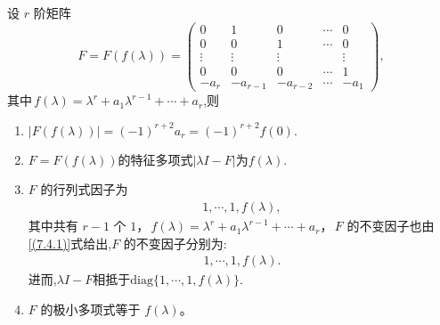 \documentclass[../../main.tex]{subfiles}
\begin{document}
\begin{lemma}[Frobenius块的基本性质]\label{lemma:Frobenius标准型矩阵的极小多项式和不变因子}
设 $r$ 阶矩阵
\[
F=F(f(\lambda)) = \begin{pmatrix}
0 & 1 & 0 & \cdots & 0 \\
0 & 0 & 1 & \cdots & 0 \\
\vdots & \vdots & \vdots & & \vdots \\
0 & 0 & 0 & \cdots & 1 \\
-a_r & -a_{r - 1} & -a_{r - 2} & \cdots & -a_1
\end{pmatrix},
\]
其中$\,f(\lambda)=\lambda^r + a_1\lambda^{r - 1}+\cdots + a_r$,则
\begin{enumerate}[(1)]
\item $|F(f(\lambda))|=(-1)^{r+2}a_r=(-1)^{r+2}f(0).$

\item $F=F(f(\lambda))$的特征多项式$|\lambda I-F|$为$f(\lambda)$.

\item $F$ 的行列式因子为
\begin{align}
1,\cdots,1,f(\lambda),\label{(7.4.1)}
\end{align}
其中共有 $r - 1$ 个 $1$，$\,f(\lambda)=\lambda^r + a_1\lambda^{r - 1}+\cdots + a_r$，$\,F$ 的不变因子也由\eqref{(7.4.1)}式给出,$F$ 的不变因子分别为:
\begin{align*}
1,\cdots,1,f(\lambda).
\end{align*}
进而,$\lambda I-F$相抵于$\mathrm{diag}\{1,\cdots,1,f(\lambda)\}.$

\item $F$ 的极小多项式等于 $f(\lambda)$。
\end{enumerate}
\end{lemma}
\end{document}
